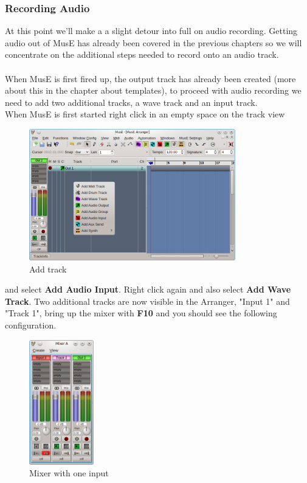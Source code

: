 \documentclass[a4paper]{report}
\newcommand{\menu}[1]{\textbf{#1}}
\newcommand{\screenshotwidth}[0]{0.8\textwidth}
\begin{document}
\subsubsection{Recording Audio}
At this point we'll make a a slight detour into full on audio recording. Getting
audio out of MusE has already been covered in the previous chapters so we will
concentrate on the additional steps needed to record onto an audio track.\\
\\
When MusE is first fired up, the
output track has already been created (more about this in the chapter about 
templates), to proceed with audio recording we need to add two additional tracks, a 
wave track and an input track.\\
When MusE is first started right click in an empty space on the track view
\begin{figure}[htp]
\centering \includegraphics[width=\screenshotwidth]
{pics/main_window_add_track}
\caption{Add track}
\label{fig:Add track}
\end{figure}
and select \menu{Add Audio Input}. Right click again and also select 
\menu{Add Wave Track}. Two additional tracks are now visible in the Arranger, 
"Input 1" and "Track 1", bring up the mixer with \menu{F10} and you should see 
the following configuration.
\begin{figure}[htp]
\centering \includegraphics[width=0.25\textwidth]{pics/mixer_with_one_input} 
\caption{Mixer with one input}
\label{fig:Mixer with one input}
\end{figure}
\end{document}
